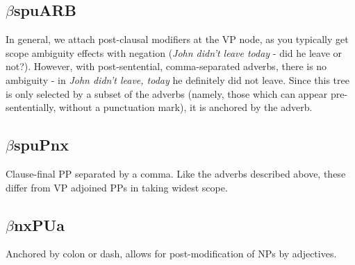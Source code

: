\subsection{$\beta$spuARB}
\label{post-adverb}

In general, we attach post-clausal modifiers at the VP node, as you
typically get scope ambiguity effects with negation ({\it John didn't
leave today} - did he leave or not?). However, with post-sentential,
comma-separated adverbs, there is no ambiguity - in {\it John didn't
leave, today} he definitely did not leave. Since this tree is only
selected by a subset of the adverbs (namely, those which can appear
pre-sententially, without a punctuation mark), it is anchored by the
adverb.



\subsection{$\beta$spuPnx}
\label{post-PP}

Clause-final PP separated by a comma. Like the adverbs described
above, these differ from VP adjoined PPs in taking widest scope.



\subsection{$\beta$nxPUa}

Anchored by colon or dash, allows for post-modification of NPs by
adjectives.
	

